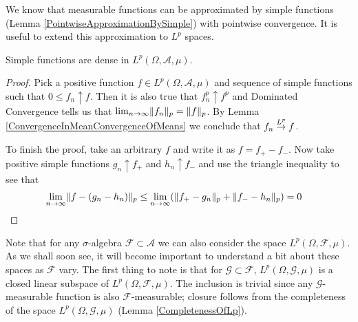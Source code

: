 We know that measurable functions can be approximated by simple
functions (Lemma \ref{PointwiseApproximationBySimple}) with pointwise
convergence.  It is useful to extend this approximation to $L^p$ spaces.
\begin{lem}\label{LpApproximationBySimple}Simple functions are dense in $L^p(\Omega, \mathcal{A}, \mu)$.
\end{lem}
\begin{proof}
Pick a positive function $f\in L^p(\Omega, \mathcal{A}, \mu)$ and sequence of simple functions
such that $0 \leq f_n \uparrow f$.  Then it is also true that $f_n^p \uparrow
f^p$ and Dominated Convergence tells us that $\lim_{n \to \infty}
\lVert f_n \rVert_p  = \lVert f \rVert_p$.  By Lemma \ref{ConvergenceInMeanConvergenceOfMeans} we conclude that $f_n
\overset{L^p}\to f$.

To finish the proof, take an arbitrary $f$ and write it as $f = f_+ -
f_-$.  Now take positive
simple functions $g_n \uparrow f_+$ and $h_n \uparrow f_-$  and use the
triangle inequality to see that
\begin{align*}
\lim_{n \to \infty} \lVert f - (g_n - h_n) \rVert_p &\leq \lim_{n \to \infty}
(\lVert f_+ - g_n \rVert_p + \lVert f_- - h_n \rVert_p ) = 0
\end{align*} 
\end{proof}

Note that for any $\sigma$-algebra $\mathcal{F} \subset \mathcal{A}$
we can also consider the space $ L^p(\Omega,  \mathcal{F}, \mu)$.  
As we shall soon see, it will become important to understand a bit
about these spaces as $\mathcal{F}$ vary.  The first thing to note is
that for $\mathcal{G} \subset \mathcal{F}$, $L^p(\Omega,  \mathcal{G},
\mu)$ is a closed linear subspace of $L^p(\Omega,  \mathcal{F},
\mu)$.  The inclusion is trivial since any $\mathcal{G}$-measurable
function is also $\mathcal{F}$-measurable; closure follows from the
completeness of the space $L^p(\Omega, \mathcal{G}, \mu)$ (Lemma
\ref{CompletenessOfLp}).

